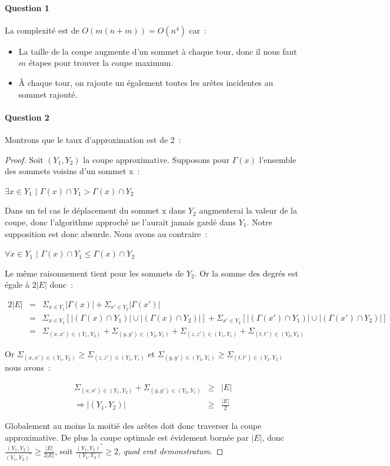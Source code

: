 \paragraph{Question 1}
La complexité est de $O(m(n+m))=O(n^4)$ car~:
\begin{itemize}
\item La taille de la coupe augmente d'un sommet à chaque tour, donc
il nous faut $m$ étapes pour trouver la coupe maximum.
\item À chaque tour, on rajoute un également toutes les arêtes
incidentes au sommet rajouté.
\end{itemize}

\paragraph{Question 2}
Montrons que le taux d'approximation est de 2~:
\begin{proof}Soit $(Y_1,Y_2)$ la coupe approximative. Supposons pour $\Gamma(x)$ l'ensemble des sommets voisins d'un sommet x~:

$\exists x \in Y_1 \text{ | } \Gamma(x) \cap Y_1 > \Gamma(x) \cap Y_2$

Dans un tel cas le déplacement du sommet x dans $Y_2$ augmenterai la valeur de la coupe, donc l'algorithme approché ne l'aurait jamais gardé dans $Y_1$. Notre supposition est donc absurde. Nous avons au contraire~:

$\forall x \in Y_1 \text{ | } \Gamma(x) \cap Y_1 \leq \Gamma(x) \cap Y_2$

Le même raisonnement tient pour les sommets de $Y_2$. Or la somme des degrés est égale à $2|E|$ donc~:

\begin{eqnarray*}
2|E| &=& \Sigma_{x \in Y_1}|\Gamma(x)|  + \Sigma_{x' \in Y_2}|\Gamma(x')| \\
	 &=& \Sigma_{x \in Y_1}[|(\Gamma(x)\cap{} Y_1)|\cup|(\Gamma(x)\cap{}Y_2)|] +
	 	 \Sigma_{x' \in Y_2}[|(\Gamma(x')\cap{} Y_1)|\cup|(\Gamma(x')\cap{}Y_2)|] \\
	 &=& \Sigma_{(x,x') \in (Y_1,Y_2)} +
	 	 \Sigma_{(y,y') \in (Y_2,Y_1)} + 
	 	 \Sigma_{(z,z') \in (Y_1,Y_1)} +
	 	 \Sigma_{(t,t') \in (Y_2,Y_2)} 
\end{eqnarray*}

Or $\Sigma_{(x,x') \in (Y_1,Y_2)} \geq \Sigma_{(z,z') \in (Y_1,Y_1)}$ et $\Sigma_{(y,y') \in (Y_2,Y_1)} \geq \Sigma_{(t,t') \in (Y_2,Y_2)}$ nous avons~:

\begin{eqnarray*}
\Sigma_{(x,x') \in (Y_1,Y_2)} + \Sigma_{(y,y') \in (Y_2,Y_1)} &\geq& |E| \\
\Rightarrow |(Y_1, Y_2)| &\geq& \frac{|E|}{2}
\end{eqnarray*}

Globalement au moins la moitié des arêtes doit donc traverser la coupe
approximative. De plus la coupe optimale est évidement bornée par
$|E|$, donc \mbox{$\frac{(Y_1,Y_2)}{(Y_1,Y_2)^*} \geq \frac{|E|}{2|E|}$},
soit \mbox{$\frac{(Y_1,Y_2)^*}{(Y_1,Y_2)} \geq 2$}, \emph{quod erat
demonstratum}.
\end{proof}

